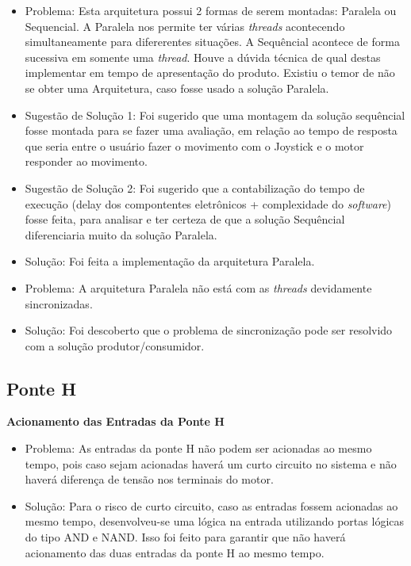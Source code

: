  \begin{itemize}
   \item Problema: Esta arquitetura possui 2 formas de serem montadas: Paralela ou Sequencial. A Paralela nos permite ter várias \textit{threads} acontecendo simultaneamente para difererentes situações. A Sequêncial acontece de forma sucessiva em somente uma  \textit{thread}. Houve a dúvida técnica de qual destas implementar em tempo de apresentação do produto. Existiu o temor de não se obter uma Arquitetura, caso fosse usado a solução Paralela.

	\item Sugestão de Solução 1: Foi sugerido que uma montagem da solução sequêncial fosse montada para se fazer uma avaliação, em relação ao tempo de resposta que seria entre o usuário fazer o movimento com o Joystick e o motor responder ao movimento.
  \item Sugestão de Solução 2: Foi sugerido que a contabilização do tempo de execução (delay dos compontentes eletrônicos + complexidade do \textit{software}) fosse feita, para analisar e ter certeza de que a solução Sequêncial diferenciaria muito da solução Paralela.
  \item Solução: Foi feita a implementação da arquitetura Paralela.

  \item Problema: A arquitetura Paralela não está com as \textit{threads} devidamente sincronizadas.
  \item Solução: Foi descoberto que o problema de sincronização pode ser resolvido com a solução produtor/consumidor.
\end{itemize}

\subsection{Ponte H}

\textbf{Acionamento das Entradas da Ponte H}

 \begin{itemize}
    \item Problema: As entradas da ponte H não podem ser acionadas ao mesmo tempo, pois caso sejam acionadas haverá um curto circuito no sistema e não haverá diferença de tensão nos terminais do motor.
    \item Solução: Para o risco de curto circuito, caso as entradas fossem acionadas ao mesmo tempo, desenvolveu-se uma lógica na entrada utilizando portas lógicas do tipo AND e NAND. Isso foi feito para garantir que não haverá acionamento das duas entradas da ponte H ao mesmo tempo.
\end{itemize}

